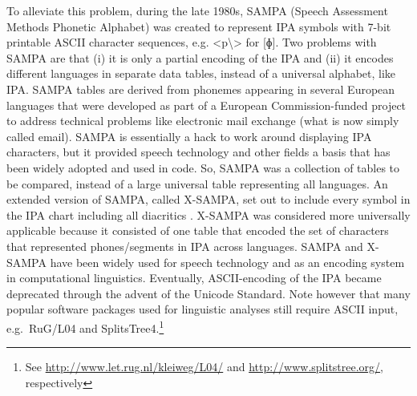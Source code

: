 To alleviate this problem, during the late 1980s, SAMPA (Speech Assessment
Methods Phonetic Alphabet) was created to represent IPA symbols with 7-bit
printable ASCII character sequences, e.g. <p\textbackslash> for [ɸ]. Two
problems with SAMPA are that (i) it is only a partial encoding of the IPA and
(ii) it encodes different languages in separate data tables, instead of a
universal alphabet, like IPA. SAMPA tables are derived from phonemes appearing
in several European languages that were developed as part of a European
Commission-funded project to address technical problems like electronic mail
exchange (what is now simply called email). SAMPA is essentially a hack to work
around displaying IPA characters, but it provided speech technology and other
fields a basis that has been widely adopted and used in code. So, SAMPA was a
collection of tables to be compared, instead of a large universal table
representing all languages. An extended version of SAMPA, called X-SAMPA, set
out to include every symbol in the IPA chart including all diacritics
\citep{WellsND}. X-SAMPA was considered more universally applicable because it
consisted of one table that encoded the set of characters that represented
phones/segments in IPA across languages. SAMPA and X-SAMPA have been widely used
for speech technology and as an encoding system in computational linguistics.
Eventually, ASCII-encoding of the IPA became deprecated through the advent of
the Unicode Standard. Note however that many popular software packages used for
linguistic analyses still require ASCII input, e.g.~RuG/L04 and
SplitsTree4.\footnote{See \url{http://www.let.rug.nl/kleiweg/L04/} and
\url{http://www.splitstree.org/}, respectively}

